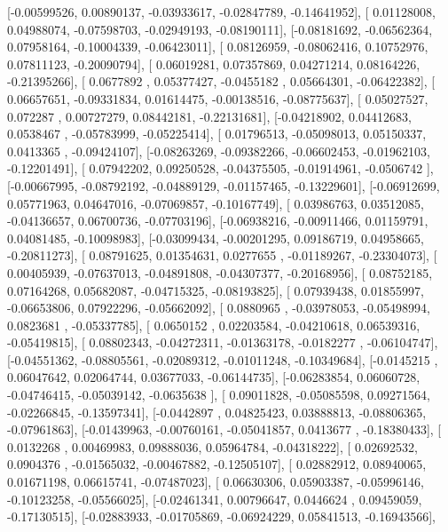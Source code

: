 \documentclass{article}
\begin{document}
       [-0.00599526,  0.00890137, -0.03933617, -0.02847789, -0.14641952],
       [ 0.01128008,  0.04988074, -0.07598703, -0.02949193, -0.08190111],
       [-0.08181692, -0.06562364,  0.07958164, -0.10004339, -0.06423011],
       [ 0.08126959, -0.08062416,  0.10752976,  0.07811123, -0.20090794],
       [ 0.06019281,  0.07357869,  0.04271214,  0.08164226, -0.21395266],
       [ 0.0677892 ,  0.05377427, -0.0455182 ,  0.05664301, -0.06422382],
       [ 0.06657651, -0.09331834,  0.01614475, -0.00138516, -0.08775637],
       [ 0.05027527,  0.072287  ,  0.00727279,  0.08442181, -0.22131681],
       [-0.04218902,  0.04412683,  0.0538467 , -0.05783999, -0.05225414],
       [ 0.01796513, -0.05098013,  0.05150337,  0.0413365 , -0.09424107],
       [-0.08263269, -0.09382266, -0.06602453, -0.01962103, -0.12201491],
       [ 0.07942202,  0.09250528, -0.04375505, -0.01914961, -0.0506742 ],
       [-0.00667995, -0.08792192, -0.04889129, -0.01157465, -0.13229601],
       [-0.06912699,  0.05771963,  0.04647016, -0.07069857, -0.10167749],
       [ 0.03986763,  0.03512085, -0.04136657,  0.06700736, -0.07703196],
       [-0.06938216, -0.00911466,  0.01159791,  0.04081485, -0.10098983],
       [-0.03099434, -0.00201295,  0.09186719,  0.04958665, -0.20811273],
       [ 0.08791625,  0.01354631,  0.0277655 , -0.01189267, -0.23304073],
       [ 0.00405939, -0.07637013, -0.04891808, -0.04307377, -0.20168956],
       [ 0.08752185,  0.07164268,  0.05682087, -0.04715325, -0.08193825],
       [ 0.07939438,  0.01855997, -0.06653806,  0.07922296, -0.05662092],
       [ 0.0880965 , -0.03978053, -0.05498994,  0.0823681 , -0.05337785],
       [ 0.0650152 ,  0.02203584, -0.04210618,  0.06539316, -0.05419815],
       [ 0.08802343, -0.04272311, -0.01363178, -0.0182277 , -0.06104747],
       [-0.04551362, -0.08805561, -0.02089312, -0.01011248, -0.10349684],
       [-0.0145215 ,  0.06047642,  0.02064744,  0.03677033, -0.06144735],
       [-0.06283854,  0.06060728, -0.04746415, -0.05039142, -0.0635638 ],
       [ 0.09011828, -0.05085598,  0.09271564, -0.02266845, -0.13597341],
       [-0.0442897 ,  0.04825423,  0.03888813, -0.08806365, -0.07961863],
       [-0.01439963, -0.00760161, -0.05041857,  0.0413677 , -0.18380433],
       [ 0.0132268 ,  0.00469983,  0.09888036,  0.05964784, -0.04318222],
       [ 0.02692532,  0.0904376 , -0.01565032, -0.00467882, -0.12505107],
       [ 0.02882912,  0.08940065,  0.01671198,  0.06615741, -0.07487023],
       [ 0.06630306,  0.05903387, -0.05996146, -0.10123258, -0.05566025],
       [-0.02461341,  0.00796647,  0.0446624 ,  0.09459059, -0.17130515],
       [-0.02883933, -0.01705869, -0.06924229,  0.05841513, -0.16943566],
\end{document}
